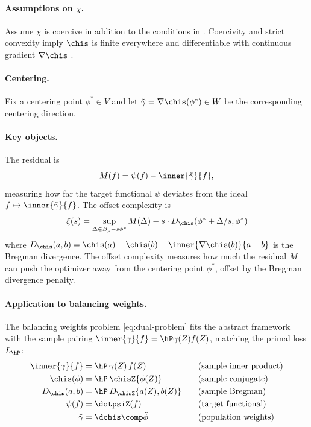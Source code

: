 \documentclass{article}
\begin{document}
\paragraph{Assumptions on $\chi$.} Assume $\chi$ is coercive in addition to the conditions in . Coercivity and strict convexity imply $\chis$ is finite everywhere and differentiable with continuous gradient $\nabla\chis$ \citep[Theorem 2.22]{peypouquet2015convex}.

\paragraph{Centering.} Fix a centering point $\phi^* \in V$ and let $\tilde\gamma = \nabla\chis(\phi^*) \in W$ be the corresponding centering direction.

\paragraph{Key objects.} The residual is
\[
M(f) = \psi(f) - \inner{\tilde\gamma}{f},
\]
measuring how far the target functional $\psi$ deviates from the ideal $f \mapsto \inner{\tilde\gamma}{f}$. The offset complexity is
\begin{equation}
\label{eq:abstract-offset-complexity}
\xi(s) = \sup_{\Delta \in B_\rho - s\phi^*} M(\Delta) - s \cdot D_{\chis}(\phi^* + \Delta/s, \phi^*)
\end{equation}
where $D_{\chis}(a, b) = \chis(a) - \chis(b) - \inner{\nabla\chis(b)}{a - b}$ is the Bregman divergence. The offset complexity measures how much the residual $M$ can push the optimizer away from the centering point $\phi^*$, offset by the Bregman divergence penalty.

\paragraph{Application to balancing weights.} The balancing weights problem \eqref{eq:dual-problem} fits the abstract framework with the sample pairing $\inner{\gamma}{f} = \hP \gamma(Z) f(Z)$, matching the primal loss $L_{\hP}$:
\[
\begin{array}{r@{\;=\;}l@{\qquad}l}
\inner{\gamma}{f} & \hP\, \gamma(Z)\, f(Z) & \text{(sample inner product)} \\[3pt]
\chis(\phi) & \hP\, \chisZ\{\phi(Z)\} & \text{(sample conjugate)} \\[3pt]
D_{\chis}(a, b) & \hP\, D_{\chisZ}\{a(Z), b(Z)\} & \text{(sample Bregman)} \\[3pt]
\psi(f) & \dotpsiZ(f) & \text{(target functional)} \\[3pt]
\tilde\gamma & \dchis \comp \tilde\phi & \text{(population weights)}
\end{array}
\]
\end{document}
